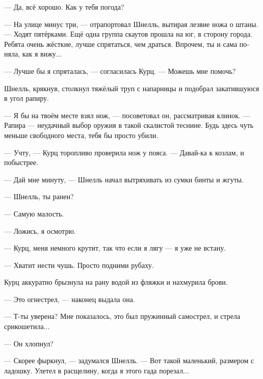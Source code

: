 \documentclass[a4paper,12pt,fleqn]{book}\usepackage{polyglossia}\setdefaultlanguage[babelshorthands=true]{russian}\setotherlanguage{english}\defaultfontfeatures{Ligatures=TeX,Mapping=tex-text}\usepackage{xcolor}\newcommand{\ml}[3]{#2}
\begin{document}
--- Да, всё хорошо.
\ml{$0$}
{Как у тебя погода?}
{What's the weather like out there?''}

\ml{$0$}
{--- На улице минус три, --- отрапортовал Шнелль, вытирая лезвие ножа о штаны.}
{``Minus three degrees Kampfbereit,'' Schnell reported, wiping knife blade with his trousers.}
--- Ходят пятёрками.
Ещё одна группа скаутов прошла на юг, в сторону города.
\ml{$0$}
{Ребята очень жёсткие, лучше спрятаться, чем драться.}
{Tough guys, it's better hide than fight.}
\ml{$0$}
{Впрочем, ты и сама поняла, как я вижу...}
{However, you already got it, I see ....''}

--- Лучше бы я спряталась, --- согласилась Курц.
\ml{$0$}
{--- Можешь мне помочь?}
{``Could you help me?''}

Шнелль, крякнув, столкнул тяжёлый труп с напарницы и подобрал закатившуюся в угол рапиру.

--- Я бы на твоём месте взял нож, --- посоветовал он, рассматривая клинок.
--- Рапира --- неудачный выбор оружия в такой скалистой теснине.
Будь здесь чуть меньше свободного места, тебя бы просто убили.

--- Учту, --- Курц торопливо проверила нож у пояса.
--- Давай-ка к козлам, и побыстрее.

--- Дай мне минуту, --- Шнелль начал вытряхивать из сумки бинты и жгуты.

\ml{$0$}
{--- Шнелль, ты ранен?}
{``Schnell, are you hurt?''}

\ml{$0$}
{--- Самую малость.}
{``Just a bit.''}

\ml{$0$}
{--- Ложись, я осмотрю.}
{``Lie down, I'll take a look.''}

\ml{$0$}
{--- Курц, меня немного крутит, так что если я лягу --- я уже не встану.}
{``Kurz, I got kinda dizzy, so I lie down here, I stay down here.''}

\ml{$0$}
{--- Хватит нести чушь.}
{``Stop goatshitting.}
\ml{$0$}
{Просто подними рубаху.}
{Just lift up your shirt.''}

Курц аккуратно брызнула на рану водой из фляжки и нахмурила брови.

\ml{$0$}
{--- Это огнестрел, --- наконец выдала она.}
{``It's a gunshot wound,'' she finally said.}

\ml{$0$}
{--- Т-ты уверена?}
{``Are---are you sure?}
Мне показалось, это был пружинный самострел, и стрела срикошетила...

\ml{$0$}
{--- Он хлопнул?}
{``You heard a clap?''}

\ml{$0$}
{--- Скорее фыркнул, --- задумался Шнелль.}
{``A sniff, I'd say,'' Schnell answered.}
\ml{$0$}
{--- Вот такой маленький, размером с ладошку.}
{``Tiny like that, hand-sized.}
Улетел в расщелину, когда я этого гада порезал...
\end{document}
